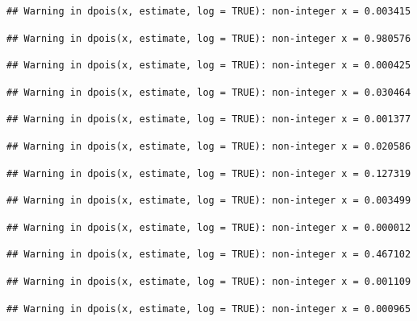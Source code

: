 \documentclass[]{article}
\begin{document}
\begin{verbatim}
## Warning in dpois(x, estimate, log = TRUE): non-integer x = 0.003415
\end{verbatim}

\begin{verbatim}
## Warning in dpois(x, estimate, log = TRUE): non-integer x = 0.980576
\end{verbatim}

\begin{verbatim}
## Warning in dpois(x, estimate, log = TRUE): non-integer x = 0.000425
\end{verbatim}

\begin{verbatim}
## Warning in dpois(x, estimate, log = TRUE): non-integer x = 0.030464
\end{verbatim}

\begin{verbatim}
## Warning in dpois(x, estimate, log = TRUE): non-integer x = 0.001377
\end{verbatim}

\begin{verbatim}
## Warning in dpois(x, estimate, log = TRUE): non-integer x = 0.020586
\end{verbatim}

\begin{verbatim}
## Warning in dpois(x, estimate, log = TRUE): non-integer x = 0.127319
\end{verbatim}

\begin{verbatim}
## Warning in dpois(x, estimate, log = TRUE): non-integer x = 0.003499
\end{verbatim}

\begin{verbatim}
## Warning in dpois(x, estimate, log = TRUE): non-integer x = 0.000012
\end{verbatim}

\begin{verbatim}
## Warning in dpois(x, estimate, log = TRUE): non-integer x = 0.467102
\end{verbatim}

\begin{verbatim}
## Warning in dpois(x, estimate, log = TRUE): non-integer x = 0.001109
\end{verbatim}

\begin{verbatim}
## Warning in dpois(x, estimate, log = TRUE): non-integer x = 0.000965
\end{verbatim}
\end{document}
